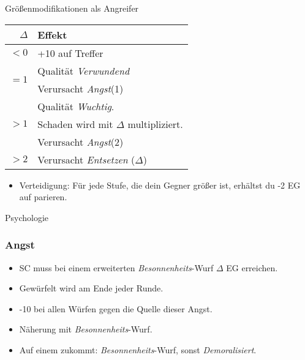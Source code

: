 \documentclass{article}
\begin{document}
\pagebreak

\begin{multicols*}{3}
    
    \begin{slsframe}{Größenmodifikationen als Angreifer}
        \begin{tabularx}{\linewidth}{rX}
            \textbf{$\Delta$}       & \textbf{Effekt} \\ \hline
            $<0$                    & +10 auf Treffer \\ \hline
            \multirow{2}{*}{$=1$}   & Qualität \textit{Verwundend} \\ 
                                    & Verursacht \textit{Angst}(1) \\ \hline
            \multirow{3}{*}{$>1$}   & Qualität \textit{Wuchtig}. \\
                                    & Schaden wird mit $\Delta$ multipliziert.  \\
                                    & Verursacht \textit{Angst}(2) \\ \hline
            $>2$                    & Verursacht \textit{Entsetzen} ($\Delta$)
        \end{tabularx}

        
        \begin{itemize}
            \item Verteidigung: Für jede Stufe, die dein Gegner größer ist, erhältst du -2 EG auf parieren.
        \end{itemize}

    \end{slsframe}

    \begin{slsframe}{Psychologie}

        \subsubsection*{Angst}
        \begin{itemize}
            \setlength\itemsep{0.1em}
            \item SC muss bei einem erweiterten \textit{Besonnenheits}-Wurf $\Delta$ EG erreichen.
            \item Gewürfelt wird am Ende jeder Runde.
            \item -10 bei allen Würfen gegen die Quelle dieser Angst.
            \item Näherung mit \textit{Besonnenheits}-Wurf.
            \item Auf einem zukommt: \textit{Besonnenheits}-Wurf, sonst \textit{Demoralisiert}.  
        \end{itemize}
        

\end{slsframe}
\end{multicols*}
\end{document}
